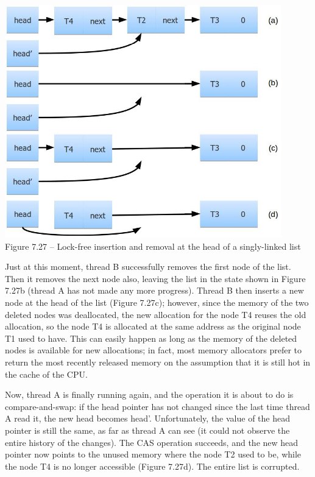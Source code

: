 \hspace*{\fill} \\ %
\begin{center}
\includegraphics[width=0.9\textwidth]{content/2/chapter7/images/27.jpg}\\
Figure 7.27 – Lock-free insertion and removal at the head of a singly-linked list
\end{center}

Just at this moment, thread B successfully removes the first node of the list. Then it removes the next node also, leaving the list in the state shown in Figure 7.27b (thread A has not made any more progress). Thread B then inserts a new node at the head of the list (Figure 7.27c); however, since the memory of the two deleted nodes was deallocated, the new allocation for the node T4 reuses the old allocation, so the node T4 is allocated at the same address as the original node T1 used to have. This can easily happen as long as the memory of the deleted nodes is available for new allocations; in fact, most memory allocators prefer to return the most recently released memory on the assumption that it is still hot in the cache of the CPU.

Now, thread A is finally running again, and the operation it is about to do is compare-and-swap: if the head pointer has not changed since the last time thread A read it, the new head becomes head'. Unfortunately, the value of the head pointer is still the same, as far as thread A can see (it could not observe the entire history of the changes). The CAS operation succeeds, and the new head pointer now points to the unused memory where the node T2 used to be, while the node T4 is no longer accessible (Figure 7.27d). The entire list is corrupted.

